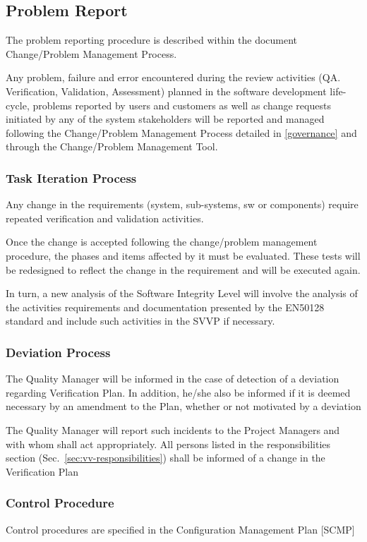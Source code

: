 \subsection{Problem Report}
The problem reporting procedure is described within the document
Change/Problem Management Process.

Any problem, failure and error encountered during the review
activities (QA. Verification, Validation, Assessment) planned in the
software development life-cycle, problems reported by users and
customers as well as change requests initiated by any of the system
stakeholders will be reported and managed following the Change/Problem
Management Process detailed in
\href{https://github.com/openETCS/governance/tree/master/Change-Problem%20Process}{[governance]} and through the Change/Problem Management Tool.

\subsubsection{Task Iteration Process}
Any change in the requirements (system, sub-systems, sw or components)
require repeated verification and validation activities. 

Once the change is accepted following the change/problem management
procedure, the phases and items affected by it must be
evaluated. These tests will be redesigned to reflect the change in the
requirement and will be executed again. 

In turn, a new analysis of the Software Integrity Level will involve
the analysis of the activities requirements and documentation
presented by the EN50128 standard and include such activities in the
SVVP if necessary. 

\subsubsection{Deviation Process}
The Quality Manager will be informed in the case of detection of a
deviation regarding Verification Plan. In addition, he/she also be
informed if it is deemed necessary by an amendment to the Plan,
whether or not motivated by a deviation 

The Quality Manager will report such incidents to the Project Managers
and with whom shall act appropriately. All persons listed in the
responsibilities section (Sec.~\ref{sec:vv-responsibilities}) shall be
informed of a change in the Verification Plan

\subsubsection{Control Procedure}
Control procedures are specified in the Configuration Management Plan [SCMP]
